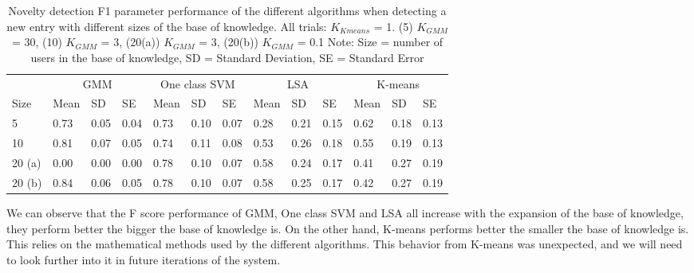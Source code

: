 \begin{table}[!ht]
	\footnotesize
	\renewcommand{\arraystretch}{2}
	\begin{tabular}{p{1.2cm}p{0.7cm}p{0.6cm}p{0.7cm}p{0.7cm}p{0.6cm}p{0.7cm}p{0.7cm}p{0.6cm}p{0.7cm}p{0.7cm}p{0.6cm}p{0.7cm}}
	\hline 
	 & \multicolumn{3}{c}{GMM}& \multicolumn{3}{c}{One class SVM}& \multicolumn{3}{c}{LSA}& \multicolumn{3}{c}{K-means} \\
	Size  & Mean    & SD & SE& Mean    & SD & SE& Mean    & SD & SE& Mean    & SD & SE \\
	\hline
	5  & 0.73 & 0.05 & 0.04 & 0.73 & 0.10 & 0.07 & 0.28 & 0.21 & 0.15 & 0.62 & 0.18 & 0.13 \\
	10 & 0.81 & 0.07 & 0.05 & 0.74 & 0.11 & 0.08 & 0.53 & 0.26 & 0.18 & 0.55 & 0.19 & 0.13 \\
	20 (a)  & 0.00 & 0.00 & 0.00 & 0.78 & 0.10 & 0.07 & 0.58 & 0.24 & 0.17 & 0.41 & 0.27 & 0.19    \\ 
	20 (b) & 0.84 & 0.06 & 0.05 & 0.78 & 0.10 & 0.07 & 0.58 & 0.25 & 0.17 & 0.42 & 0.27 & 0.19    \\
	\hline
	\end{tabular}
	\centering
	\caption[Novelty detection F score performance with different sizes of knowledge]{Novelty detection F1 parameter performance of the different algorithms when detecting a new entry  with different sizes of the base of knowledge. All trials: $ K_{Kmeans} $ = 1. (5) $ K_{GMM} $ = 30, (10) $ K_{GMM} $ = 3, (20(a)) $ K_{GMM} $ = 3, (20(b)) $ K_{GMM} $ = 0.1  Note: Size = number of users in the base of knowledge, SD = Standard Deviation, SE = Standard Error \label{size}}
\end{table}

We can observe that the F score performance of GMM, One class SVM and LSA all increase with the expansion of the base of knowledge, they perform better the bigger the base of knowledge is. On the other hand, K-means performs better the smaller the base of knowledge is. This relies on the mathematical methods used by the different algorithms. This behavior from K-means was unexpected, and we will need to look further into it in future iterations of the system.  

